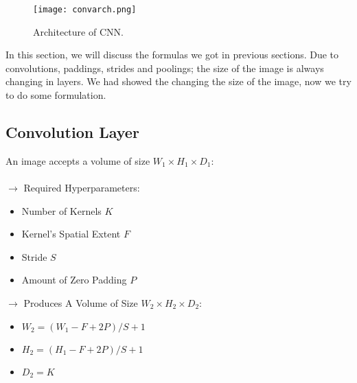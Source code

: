 \documentclass[11pt]{article}
\begin{document}
\begin{figure}[H]
\centering
\texttt{[image: convarch.png]}
\caption{Architecture of CNN.}
\label{fig:figure3}
\end{figure}
In this section, we will discuss the formulas we got in previous sections. Due to convolutions, paddings, strides and poolings; the size of the image is always changing in layers. We had showed the changing the size of the image, now we try to do some formulation.
\subsection{Convolution Layer}
\hspace*{1cm} An image accepts a volume of size $W_1 \times H_1 \times D_1$:
\\
\\
$\rightarrow$ Required Hyperparameters:
\begin{itemize}
	\item Number of Kernels $K$
	\item Kernel's Spatial Extent $F$
	\item Stride $S$
	\item Amount of Zero Padding $P$
\end{itemize}
$\rightarrow$ Produces A Volume of Size $W_2 \times H_2 \times D_2$:
\begin{itemize}
	\item $W_2 = (W_1 - F + 2P)/S +1$
	\item $H_2 = (H_1 - F + 2P)/S +1$
	\item $D_2 = K$
\end{itemize}
\end{document}
